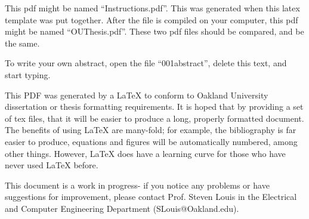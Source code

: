 This pdf might be named ``Instructions.pdf''. This was generated when this latex template was put together. 
After the file is compiled on your computer, this pdf might be named ``OUThesis.pdf''. 
These two pdf files should be compared, and be the same.

To write your own abstract, open the file ``001abstract'', delete this text, and start typing.

This PDF was generated by a LaTeX to conform to Oakland University dissertation or thesis formatting requirements. 
It is hoped that by providing a set of tex files, that it will be easier to produce a long, properly formatted document.
The benefits of using LaTeX are many-fold; for example, the bibliography is far easier to produce, equations and figures will be automatically numbered, among other things.
However, LaTeX does have a learning curve for those who have never used LaTeX before.

This document is a work in progress- if you notice any problems or have suggestions for improvement, please contact Prof. Steven Louis in the Electrical and Computer Engineering Department (SLouis@Oakland.edu).